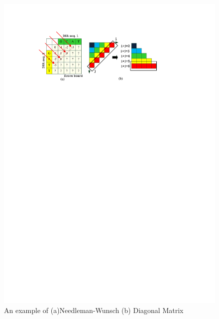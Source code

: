\documentclass[10pt,journal,compsoc]{IEEEtran}
\begin{document}



\begin{figure}[tpb]
\begin{center}
\graphicspath{{picture/}}
\includegraphics[scale=0.65]{Dia_Example}
\caption{An example of (a)Needleman-Wunsch (b) Diagonal Matrix}
\label{fig:DiaExample}
\end{center}
\end{figure}
\end{document}
